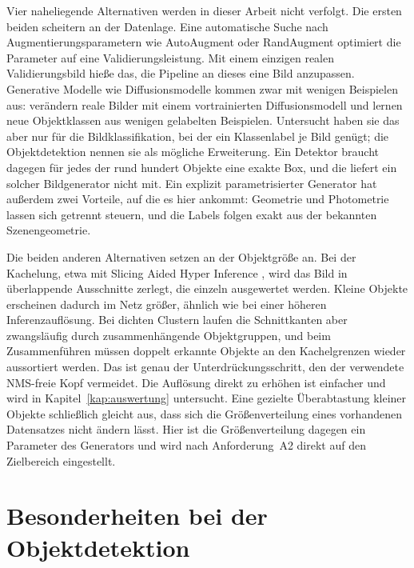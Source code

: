  Vier naheliegende Alternativen werden in
dieser Arbeit nicht verfolgt. Die ersten beiden scheitern an der Datenlage.
Eine automatische Suche nach Augmentierungsparametern
wie AutoAugment \parencite{cubuk2019} oder RandAugment \parencite{cubuk2020}
optimiert die Parameter auf eine Validierungsleistung. Mit einem einzigen
realen Validierungsbild hieße das, die Pipeline an dieses eine Bild anzupassen.
Generative Modelle wie Diffusionsmodelle kommen zwar mit wenigen Beispielen aus:
\textcite{trabucco2024} verändern reale Bilder mit einem vortrainierten
Diffusionsmodell und lernen neue Objektklassen aus wenigen gelabelten
Beispielen. Untersucht haben sie das aber nur für die Bildklassifikation, bei
der ein Klassenlabel je Bild genügt; die Objektdetektion nennen sie als mögliche
Erweiterung. Ein Detektor braucht dagegen für jedes der rund hundert Objekte
eine exakte Box, und die liefert ein solcher Bildgenerator nicht mit. Ein
explizit parametrisierter Generator hat außerdem zwei Vorteile, auf die es hier
ankommt: Geometrie und Photometrie lassen sich getrennt steuern, und die Labels
folgen exakt aus der bekannten Szenengeometrie.

Die beiden anderen Alternativen setzen an der Objektgröße an. Bei der Kachelung,
etwa mit Slicing Aided Hyper Inference \parencite{akyon2022sahi}, wird das Bild
in überlappende Ausschnitte zerlegt, die einzeln ausgewertet werden. Kleine
Objekte erscheinen dadurch im Netz größer, ähnlich wie bei einer höheren
Inferenzauflösung. Bei dichten Clustern laufen die Schnittkanten aber
zwangsläufig durch zusammenhängende Objektgruppen, und beim Zusammenführen
müssen doppelt erkannte Objekte an den Kachelgrenzen wieder aussortiert werden.
Das ist genau der Unterdrückungsschritt, den der verwendete NMS-freie Kopf
vermeidet. Die Auflösung direkt zu erhöhen ist einfacher und wird in
Kapitel~\ref{kap:auswertung} untersucht. Eine gezielte Überabtastung kleiner
Objekte \parencite{kisantal2019} schließlich gleicht aus, dass sich die
Größenverteilung eines vorhandenen Datensatzes nicht ändern lässt. Hier ist die
Größenverteilung dagegen ein Parameter des Generators und wird nach
Anforderung~A2 direkt auf den Zielbereich eingestellt.

\section{Besonderheiten bei der Objektdetektion}
\label{sec:aug-detektion}

